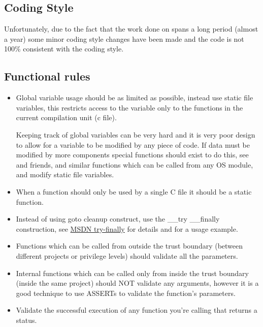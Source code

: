 \begin{appendices}
\chapter{Coding Style}

Unfortunately, due to the fact that the work done on \projectname spans a long period (almost a
year) some minor coding style changes have been made and the code is not 100\% consistent with the
coding style.

\section{Functional rules}
\begin{itemize}
	\item Global variable usage should be as limited as possible, instead use static file variables,
this restricts access to the variable only to the functions in the current compilation unit (c file).

	Keeping track of global variables can be very hard and it is very poor design to allow for a
variable to be modified by any piece of code. If data must be modified by more components special
functions should exist to do this, see  and friends, 
and similar functions which can be called from any OS module, and modify static file variables.

	\item When a function should only be used by a single C file it should be a static function.

	\item Instead of using goto cleanup construct, use the \_\_try \_\_finally construction, see
\href{https://msdn.microsoft.com/en-us/library/9xtt5hxz.aspx}{MSDN try-finally} for details and
 for a usage example.

	\item Functions which can be called from outside the trust boundary (between different projects
or privilege levels) should validate all the parameters.

	\item Internal functions which can be called only from inside the trust boundary (inside the
same project) should NOT validate any arguments, however it is a good technique to use ASSERTs to
validate the function's parameters.

	\item Validate the successful execution of any function you're calling that returns a status.


\end{itemize}
\end{appendices}
